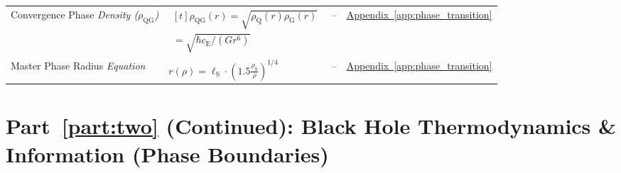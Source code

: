 \begin{longtable}{@{} p{4.5cm} p{6cm} c p{4cm} @{}}
{\raggedright Convergence Phase \newline \textit{Density ($\rho_{\mathrm{QG}}$)}\par} & {\raggedright $\begin{gathered}[t]\rho_{\mathrm{QG}}(r)=\sqrt{\rho_{\mathrm Q}(r)\rho_{\mathrm G}(r)} \\ =\sqrt{\hbar c_{\mathrm E}/(Gr^6)}\end{gathered}$\par} & -- & {\raggedright \hyperref[app:phase_transition]{Appendix~\ref*{app:phase_transition}}\par} \\

{\raggedright Master Phase Radius \newline \textit{Equation}\par} & {\raggedright $r(\rho) = \ell_{\mathrm{S}} \cdot \left(1.5 \frac{\rho_{\mathrm{S}}}{\rho}\right)^{1/4}$\par} & -- & {\raggedright \hyperref[app:phase_transition]{Appendix~\ref*{app:phase_transition}}\par} \\

\bottomrule
\end{longtable}

\par\ifdim\dimexpr\pagegoal-\pagetotal\relax<12\baselineskip\newpage\fi
\section*{Part~\ref{part:two} (Continued): Black Hole Thermodynamics \& Information (Phase Boundaries)}

